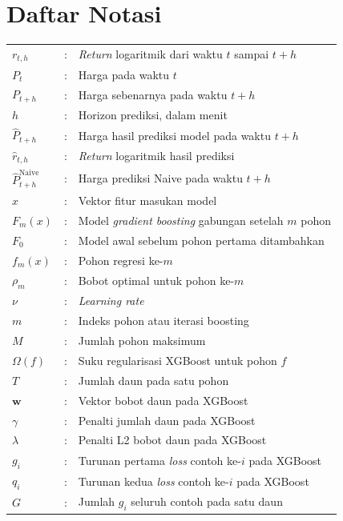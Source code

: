 \chapter*{Daftar Notasi}
{}
\begingroup
{}
\begin{longtable}{@{}p{3cm}@{}p{0.6cm}@{}p{\dimexpr\textwidth-3.6cm\relax}@{}}
  $r_{t,h}$ & : & \textit{Return} logaritmik dari waktu $t$ sampai $t+h$ \\
  $P_t$ & : & Harga pada waktu $t$ \\
  $P_{t+h}$ & : & Harga sebenarnya pada waktu $t+h$ \\
  $h$ & : & Horizon prediksi, dalam menit \\
  $\hat{P}_{t+h}$ & : & Harga hasil prediksi model pada waktu $t+h$ \\
  $\hat{r}_{t,h}$ & : & \textit{Return} logaritmik hasil prediksi \\
  $\hat{P}_{t+h}^{\text{Naive}}$ & : & Harga prediksi Naive pada waktu $t+h$ \\
  $x$ & : & Vektor fitur masukan model \\
  $F_m(x)$ & : & Model \textit{gradient boosting} gabungan setelah $m$ pohon \\
  $F_0$ & : & Model awal sebelum pohon pertama ditambahkan \\
  $f_m(x)$ & : & Pohon regresi ke-$m$ \\
  $\rho_m$ & : & Bobot optimal untuk pohon ke-$m$ \\
  $\nu$ & : & \textit{Learning rate} \\
  $m$ & : & Indeks pohon atau iterasi boosting \\
  $M$ & : & Jumlah pohon maksimum \\
  $\Omega(f)$ & : & Suku regularisasi XGBoost untuk pohon $f$ \\
  $T$ & : & Jumlah daun pada satu pohon \\
  $\mathbf{w}$ & : & Vektor bobot daun pada XGBoost \\
  $\gamma$ & : & Penalti jumlah daun pada XGBoost \\
  $\lambda$ & : & Penalti L2 bobot daun pada XGBoost \\
  $g_i$ & : & Turunan pertama \textit{loss} contoh ke-$i$ pada XGBoost \\
  $q_i$ & : & Turunan kedua \textit{loss} contoh ke-$i$ pada XGBoost \\
  $G$ & : & Jumlah $g_i$ seluruh contoh pada satu daun \\

\end{longtable}
